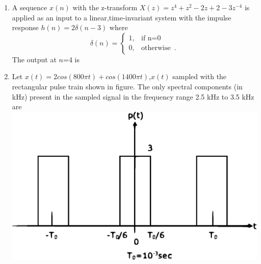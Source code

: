 \documentclass[journal,12pt,twocolumn]{IEEEtran}
\begin{document}
\begin{enumerate}
\item A sequence $x(n)$ with the z-transform $X(z)=z^{4}+z^{2}-2z+2-3z^{-4}$ is applied as an input to a linear,time-invariant system with the impulse response $h(n)=2\delta(n-3)$ where
\[
	\delta(n)=\begin{cases}
		1, & \text{if n=0 }  \\
		0, & \text{otherwise }\,.
	\end{cases}
\]
The output at $n$=4 is
\begin{enumerate}[(A)]
\end{enumerate}

\item Let $x(t)=2cos(800\pi t)+cos(1400\pi t)$,$x(t)$ sampled with the rectangular pulse train shown in figure. The only spectral components (in kHz) present in the sampled signal in the frequency range 2.5 kHz to 3.5 kHz are \\

\includegraphics[scale=0.4]{fig2.eps}\\

\begin{enumerate}[(A)]
\end{enumerate}


\end{enumerate}
\end{document}
